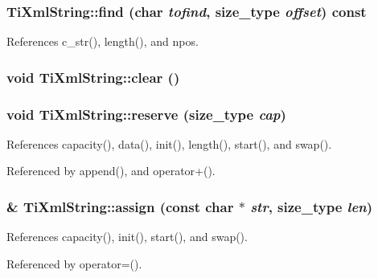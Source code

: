 \subsubsection[find]{ TiXmlString::find (char {\em tofind}, \/  {\bf size\_\-type} {\em offset}) const\hspace{0.3cm}{\tt  [inline]}}\label{classTiXmlString_5f2a6fd565751410b392f249a9786db4}




References c\_\-str(), length(), and npos.
\subsubsection[clear]{\setlength{\rightskip}{0pt plus 5cm}void TiXmlString::clear ()\hspace{0.3cm}{\tt  [inline]}}\label{classTiXmlString_b20e06e4c666abf3bdbfb3a1191d4888}


\subsubsection[reserve]{\setlength{\rightskip}{0pt plus 5cm}void TiXmlString::reserve ({\bf size\_\-type} {\em cap})}\label{classTiXmlString_88ecf9f0f00cb5c67b6b637958d7049c}




References capacity(), data(), init(), length(), start(), and swap().

Referenced by append(), and operator+().
\subsubsection[assign]{ \& TiXmlString::assign (const char $\ast$ {\em str}, \/  {\bf size\_\-type} {\em len})}\label{classTiXmlString_c72f3d9149b7812c1e6c59402014d0d5}




References capacity(), init(), start(), and swap().

Referenced by operator=().
